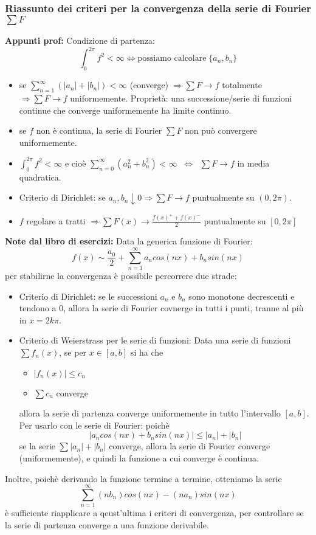 \subsubsection{Riassunto dei criteri per la convergenza della serie di Fourier $\sum F$}
\textbf{Appunti prof:}\newline
Condizione di partenza:
\[
    \int_{0}^{2\pi}f^2 < \infty \Leftrightarrow \text{possiamo calcolare}\;\{a_n, b_n\}
\]
\begin{itemize}
    \item se $\sum_{n=1}^{\infty}(|a_n| + |b_n|) < \infty$ (converge) $\Rightarrow \sum F \rightarrow f$ totalmente $\Rightarrow \sum F \rightarrow  f$ uniformemente.\newline
    Proprietà: una successione/serie di funzioni continue che converge uniformemente ha limite continuo.
    \item se $f$ non è continua, la serie di Fourier $\sum F$ non può convergere uniformemente.
    \item $\int_{0}^{2\pi}f^2 < \infty $ e cioè $\sum_{n=0}^{\infty}(a_n^2 + b_n^2)< \infty \;\;\Longleftrightarrow \;\;\sum F \rightarrow f$ in media quadratica.
    \item Criterio di Dirichlet: se $a_n, b_n \downarrow 0 \Rightarrow  \sum F \rightarrow f$ puntualmente su $(0,2\pi)$.
    \item $f$ regolare a tratti $\Rightarrow \sum F(x) \rightarrow  \frac{f(x)^+ + f(x)^-}{2}$ puntualmente su $[0,2\pi]$
\end{itemize}
\textbf{Note dal libro di esercizi:}\newline
Data la generica funzione di Fourier:
\[
    f(x) \sim  \frac{a_0}{2} + \sum_{n=1}^{\infty} a_n cos(nx) + b_n sin(nx)
\]
per stabilirne la convergenza è possibile percorrere due strade:
\begin{itemize}
    \item Criterio di Dirichlet: se le successioni $a_n$ e $b_n$ sono monotone decrescenti e tendono a $0$, allora la serie di Fourier covnerge in tutti i punti, tranne al più in $x = 2k\pi$.
    \item Criterio di Weierstrass per le serie di funzioni: Data una serie di funzioni $\sum f_n(x)$, se per $x \in [a,b]$ si ha che
    \begin{itemize}
        \item $|f_n(x)| \leq c_n$
        \item $\sum c_n$ converge
    \end{itemize}
    allora la serie di partenza converge uniformemente in tutto l'intervallo $[a,b]$.\newline
    Per usarlo con le serie di Fourier: poichè
    \[
        |a_n cos(nx) + b_n sin(nx)| \leq |a_n| + |b_n|
    \]
    se la serie $\sum |a_n| + |b_n|$ converge, allora la serie di Fourier converge (uniformemente), e quindi la funzione a cui converge è continua.
\end{itemize}
Inoltre, poichè derivando la funzione termine a termine, otteniamo la serie
\[
    \sum_{n=1}^{\infty} (n b_n ) cos(nx) - (n a_n)sin(nx)
\]
è sufficiente riapplicare a qeust'ultima i criteri di convergenza, per controllare se la serie di partenza converge a una funzione derivabile.
